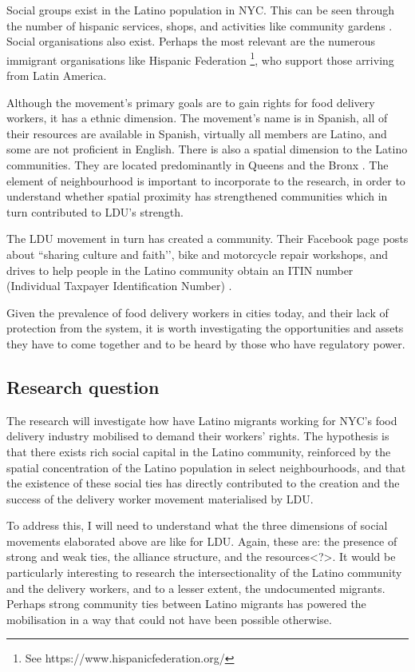\documentclass{article}
\begin{document}
Social groups exist in the Latino population in NYC. This can be seen through the number of hispanic services, shops, and activities like community gardens \parencite{saldivar2004culturing}. Social organisations also exist. Perhaps the most relevant are the numerous immigrant organisations like Hispanic Federation \footnote{See https://www.hispanicfederation.org/}, who support those arriving from Latin America. 

Although the movement’s primary goals are to gain rights for food delivery workers, it has a ethnic dimension. The movement’s name is in Spanish, all of their resources are available in Spanish, virtually all members are Latino, and some are not proficient in English. There is also a spatial dimension to the Latino communities. They are located predominantly in Queens and the Bronx \parencite{nycimmigrantpopulation2021}. The element of neighbourhood is important to incorporate to the research, in order to understand whether spatial proximity has strengthened communities which in turn contributed to LDU’s strength.

The LDU movement in turn has created a community. Their Facebook page posts about ``sharing culture and faith’’, bike and motorcycle repair workshops, and drives to help people in the Latino community obtain an ITIN number (Individual Taxpayer Identification Number) \parencite{https://www.facebook.com/DeliveristasUnidos}.

Given the prevalence of food delivery workers in cities today, and their lack of protection from the system, it is worth investigating the opportunities and assets they have to come together and to be heard by those who have regulatory power.

\subsection{Research question}

The research will investigate how have Latino migrants working for NYC’s food delivery industry mobilised to demand their workers’ rights. 
The hypothesis is that there exists rich social capital in the Latino community, reinforced by the spatial concentration of the Latino population in select neighbourhoods, and that the existence of these social ties has directly contributed to the creation and the success of the delivery worker movement materialised by LDU.

To address this, I will need to understand what the three dimensions of social movements elaborated above are like for LDU. Again, these are: the presence of strong and weak ties, the alliance structure, and the resources<?>. 
It would be particularly interesting to research the intersectionality of the Latino community and the delivery workers, and to a lesser extent, the undocumented migrants. Perhaps strong community ties between Latino migrants has powered the mobilisation in a way that could not have been possible otherwise.
\end{document}
